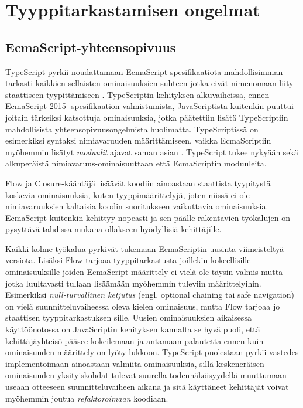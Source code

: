 \chapter{Tyyppitarkastamisen ongelmat}

\section{EcmaScript-yhteensopivuus}
TypeScript pyrkii nou\-dat\-ta\-maan Ecma\-Script-spe\-si\-fi\-kaa\-ti\-o\-ta
mah\-dol\-li\-sim\-man tar\-kas\-ti\newline
kaik\-ki\-en sellaisten ominaisuuksien
suhteen jotka eivät nimenomaan liity staattiseen tyypittämiseen
\cite{TypeScript_DesignGoals}. TypeScriptin kehityksen alkuvaiheissa, ennen
EcmaScript 2015 -spe\-si\-fi\-kaa\-ti\-on valmistumista, JavaScriptista
kuitenkin puuttui joitain tärkeiksi katsottuja ominaisuuksia, jotka
päätettiin lisätä TypeScriptiin mahdollisista
yh\-teen\-so\-pi\-vuus\-ongel\-mi\-sta huolimatta. TypeScrip\-tis\-sä on
esimerkiksi syntaksi ni\-mi\-a\-va\-ruu\-den määrittämiseen, vaikka
EcmaScriptiin myöhemmin lisätyt \textit{moduulit} ajavat saman asian
\cite{TypeScript_issuecomment_esnextfeatures}. TypeScript tukee nykyään sekä
al\-ku\-pe\-räis\-tä ni\-mi\-a\-va\-ruus-o\-mi\-nai\-suut\-taan että
EcmaScriptin mo\-duu\-lei\-ta.

Flow ja Closure-kääntäjä lisäävät koodiin ainoastaan staattista tyypitystä
koskevia ominaisuuksia, kuten tyyppimäärittelyjä, joten niissä ei ole
nimiavaruuksien kaltaisia koodin suoritukseen vaikuttavia ominaisuuksia.
EcmaScript kuitenkin kehittyy nopeasti ja sen päälle rakentavien työkalujen
on pysyttävä tahdissa mukana ollakseen hyödyllisiä kehittäjille.

Kaikki kolme työkalua pyrkivät tukemaan EcmaScriptin uusinta viimeisteltyä
versiota. Lisäksi Flow tarjoaa tyyppitarkastusta joillekin kokeellisille
ominaisuuksille joiden EcmaScript-määrittely ei vielä ole täysin valmis mutta
jotka luultavasti tullaan lisäämään myöhemmin tuleviin määrittelyihin. Esimerkiksi
\textit{null-turvallinen ketjutus} (engl. optional chaining tai safe navigation)
\cite{Optional_Chaining_proposal} on vielä
suunnitteluvaiheessa oleva kielen ominaisuus, mutta Flow tarjoaa jo
staattisen tyyppitarkastuksen sille. Uusien ominaisuuksien aikaisessa
käyttöönotossa on JavaScriptin kehityksen kannalta se hyvä puoli, että
kehittäjäyhteisö pääsee kokeilemaan ja antamaan palautetta ennen kuin ominaisuuden
määrittely on lyöty lukkoon. TypeScript puolestaan pyrkii vastedes implementoimaan
ainoastaan valmiita ominaisuuksia, sillä keskeneräisen ominaisuuden yksityiskohdat
tulevat suurella todennäköisyydellä muuttumaan useaan otteeseen suunnitteluvaiheen
aikana ja sitä käyttäneet kehittäjät voivat myöhemmin joutua
\textit{refaktoroimaan} koodiaan.

